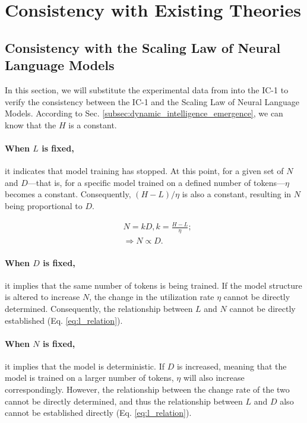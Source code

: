 \documentclass{article}
\theoremstyle{plain}
\theoremstyle{definition}
\theoremstyle{remark}
\begin{document}
\section{Consistency with Existing Theories}

\subsection{Consistency with the Scaling Law of Neural Language Models}\label{subsec:consis_scaling_law}

In this section, we will substitute the experimental data from \cite{ScalingLaw1_2020} into the IC-1 to verify the consistency between the IC-1 and the Scaling Law of Neural Language Models. According to Sec. \ref{subsec:dynamic_intelligence_emergence}, we can know that the $H$ is a constant.

\paragraph{When $L$ is fixed, }it indicates that model training has stopped. At this point, for a given set of $N$ and $D$—that is, for a specific model trained on a defined number of tokens—$\eta$ becomes a constant. Consequently, $(H-L)/\eta$ is also a constant, resulting in $N$ being proportional to $D$.

\begin{equation}
\begin{aligned}
    & N=kD,k=\frac{H-L}{\eta}; \\
    & \Rightarrow N \propto D.
\end{aligned}
\end{equation}

\paragraph{When $D$ is fixed, } it implies that the same number of tokens is being trained. If the model structure is altered to increase $N$, the change in the utilization rate $\eta$ cannot be directly determined. Consequently, the relationship between $L$ and $N$ cannot be directly established (Eq. \ref{eq:l_relation}).

\paragraph{When $N$ is fixed, }it implies that the model is deterministic. If $D$ is increased, meaning that the model is trained on a larger number of tokens, $\eta$ will also increase correspondingly. However, the relationship between the change rate of the two cannot be directly determined, and thus the relationship between $L$ and $D$ also cannot be established directly (Eq. \ref{eq:l_relation}).
\end{document}
